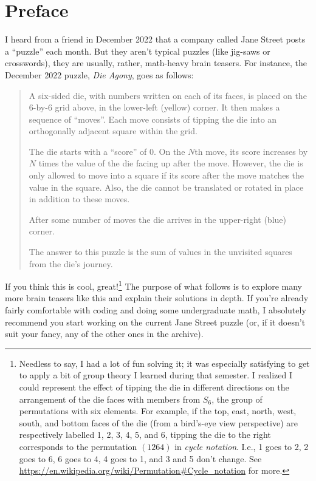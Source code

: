 \documentclass{book}
\begin{document}
\chapter*{Preface}
I heard from a friend in December 2022 that a company called Jane Street posts a ``puzzle'' each month. But they aren't typical puzzles (like jig-saws or crosswords), they are usually, rather, math-heavy brain teasers. For instance, the December 2022 puzzle, \emph{Die Agony}, goes as follows:
\[

\]
\begin{quote}
A six-sided die, with numbers written on each of its faces, is placed on the 6-by-6 grid above, in the lower-left (yellow) corner. It then makes a sequence of ``moves''. Each move consists of tipping the die into an orthogonally adjacent square within the grid.

The die starts with a ``score'' of 0. On the $N$th move, its score increases by $N$ times the value of the die facing up after the move. However, the die is only allowed to move into a square if its score after the move matches the value in the square. Also, the die cannot be translated or rotated in place in addition to these moves.

After some number of moves the die arrives in the upper-right (blue) corner.

The answer to this puzzle is the sum of values in the unvisited squares from the die's journey.
\end{quote}

If you think this is cool, great!\footnote{Needless to say, I had a lot of fun solving it; it was especially satisfying to get to apply a bit of group theory I learned during that semester. I realized I could represent the effect of tipping the die in different directions on the arrangement of the die faces with members from $S_6$, the group of permutations with six elements. For example, if the top, east, north, west, south, and bottom faces of the die (from a bird's-eye view perspective) are respectively labelled 1, 2, 3, 4, 5, and 6, tipping the die to the right corresponds to the permutation $(1264)$ in \emph{cycle notation}. I.e., 1 goes to 2, 2 goes to 6, 6 goes to 4, 4 goes to 1, and 3 and 5 don't change. See \url{https://en.wikipedia.org/wiki/Permutation\#Cycle_notation} for more.} The purpose of what follows is to explore many more brain teasers like this and explain their solutions in depth. If you're already fairly comfortable with coding and doing some undergraduate math, I absolutely recommend you
start working on the current Jane Street puzzle (or, if it doesn't suit your fancy, any of the other ones in the archive).
\end{document}
